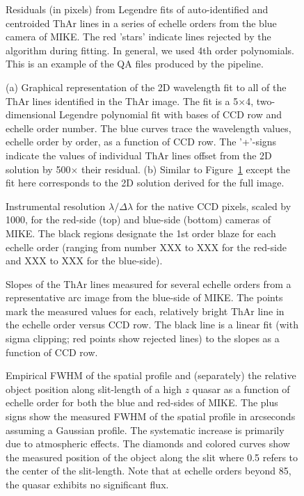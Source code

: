 \documentclass[12pt,preprint]{aastex}
\begin{document}
\begin{figure}
\caption{Residuals (in pixels) from Legendre fits of auto-identified
and centroided ThAr lines in a series of echelle orders from the
blue camera of MIKE.  The red 'stars' indicate lines rejected by
the algorithm during fitting.  In general, we used 4th order
polynomials.  This is an example of the QA files produced by the
pipeline.
}
\label{fig:wav1D}
\end{figure}

\begin{figure}
\caption{(a) Graphical representation of the 2D wavelength
fit to all of the ThAr lines identified in the ThAr image.
The fit is a 5$\times$4, two-dimensional Legendre polynomial
fit with bases of CCD row and echelle order number.
The blue curves trace the wavelength values, echelle order by
order, as a function of CCD row.  The '+'-signs indicate
the values of individual ThAr lines offset from the 2D solution
by 500$\times$ their residual.
(b)  Similar to Figure~\ref{fig:wav1D} except the fit here
corresponds to the 2D solution derived for the full image.
}
\label{fig:wav2D}
\end{figure}

\begin{figure}
\caption{Instrumental resolution $\lambda / \Delta \lambda$ for
the native CCD pixels, scaled by 1000, for the red-side (top) and 
blue-side (bottom) cameras of MIKE.  The black regions designate
the 1st order blaze for each echelle order (ranging from number XXX to
XXX for the red-side and XXX to XXX for the blue-side).
}
\label{fig:wavdisp}
\end{figure}


\begin{figure}
\caption{Slopes of the ThAr lines measured for several echelle
orders from a representative arc image from the blue-side of MIKE.
The points mark the measured values for each, relatively bright ThAr 
line in the echelle order versus CCD row.  The black line
is a linear fit (with sigma clipping; red points show rejected lines)
to the slopes as a function of CCD row.
}
\label{fig:tilt}
\end{figure}

\begin{figure}
\caption{Empirical FWHM of the spatial profile and (separately)
the relative object position along slit-length of a high $z$ quasar
as a function of echelle order for both the blue and red-sides of MIKE. 
The plus signs show the measured FWHM of the spatial profile in arcseconds
assuming a Gaussian profile.  The systematic increase is primarily
due to atmospheric effects.  The diamonds and colored curves
show the measured position of the object along the slit where 0.5
refers to the center of the slit-length.  Note that at echelle orders
beyond 85, the quasar exhibits no significant flux. 
}
\label{fig:fwhm}
\end{figure}
\end{document}

